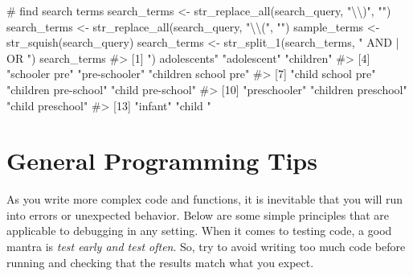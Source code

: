 \documentclass[
  letterpaper,
]{krantz}
\makeatletter
\newenvironment{Shaded}{\begin{snugshade}}{\end{snugshade}}
\newcommand{\CommentTok}[1]{\textcolor[rgb]{0.37,0.37,0.37}{#1}}
\newcommand{\FunctionTok}[1]{\textcolor[rgb]{0.28,0.35,0.67}{#1}}
\newcommand{\NormalTok}[1]{\textcolor[rgb]{0.00,0.23,0.31}{#1}}
\newcommand{\OtherTok}[1]{\textcolor[rgb]{0.00,0.23,0.31}{#1}}
\newcommand{\SpecialCharTok}[1]{\textcolor[rgb]{0.37,0.37,0.37}{#1}}
\newcommand{\StringTok}[1]{\textcolor[rgb]{0.13,0.47,0.30}{#1}}
\newenvironment{kframe}{%
\medskip{}
\setlength{\fboxsep}{.8em}
 \def\at@end@of@kframe{}%
 \ifinner\ifhmode%
  \def\at@end@of@kframe{\end{minipage}}%
  \begin{minipage}{\columnwidth}%
 \fi\fi%
 \def\FrameCommand##1{\hskip\@totalleftmargin \hskip-\fboxsep
 \colorbox{shadecolor}{##1}\hskip-\fboxsep
     \hskip-\linewidth \hskip-\@totalleftmargin \hskip\columnwidth}%
 \MakeFramed {\advance\hsize-\width
   \@totalleftmargin\z@ \linewidth\hsize
   \@setminipage}}%
 {\par\unskip\endMakeFramed%
 \at@end@of@kframe}
\renewenvironment{Shaded}{\begin{kframe}}{\end{kframe}}
\makeatother
\begin{document}
\begin{Shaded}
\begin{Highlighting}[]
\CommentTok{\# find search terms}
\NormalTok{search\_terms }\OtherTok{\textless{}{-}} \FunctionTok{str\_replace\_all}\NormalTok{(search\_query, }\StringTok{"}\SpecialCharTok{\textbackslash{}\textbackslash{}}\StringTok{)"}\NormalTok{, }\StringTok{""}\NormalTok{)}
\NormalTok{search\_terms }\OtherTok{\textless{}{-}} \FunctionTok{str\_replace\_all}\NormalTok{(search\_query, }\StringTok{"}\SpecialCharTok{\textbackslash{}\textbackslash{}}\StringTok{("}\NormalTok{, }\StringTok{""}\NormalTok{)}
\NormalTok{sample\_terms }\OtherTok{\textless{}{-}} \FunctionTok{str\_squish}\NormalTok{(search\_query)}
\NormalTok{search\_terms }\OtherTok{\textless{}{-}} \FunctionTok{str\_split\_1}\NormalTok{(search\_terms, }\StringTok{" AND | OR "}\NormalTok{)}
\NormalTok{search\_terms}
\CommentTok{\#\textgreater{}  [1] ") adolescents"       "adolescent"          "children"           }
\CommentTok{\#\textgreater{}  [4] "schooler pre"        "pre{-}schooler"        "children school pre"}
\CommentTok{\#\textgreater{}  [7] "child school pre"    "children pre{-}school" "child pre{-}school"   }
\CommentTok{\#\textgreater{} [10] "preschooler"         "children preschool"  "child preschool"    }
\CommentTok{\#\textgreater{} [13] "infant"              "child "}
\end{Highlighting}
\end{Shaded}

\hypertarget{general-programming-tips}{%
\section{General Programming Tips}\label{general-programming-tips}}

As you write more complex code and functions, it is inevitable that you
will run into errors or unexpected behavior. Below are some simple
principles that are applicable to debugging in any setting. When it
comes to testing code, a good mantra is \emph{test early and test
often}. So, try to avoid writing too much code before running and
checking that the results match what you expect.
\end{document}
